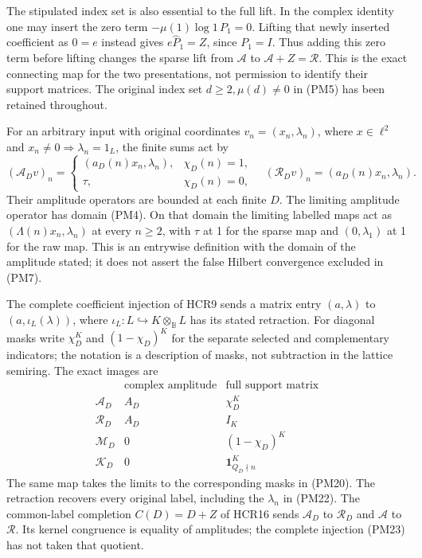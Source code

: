 \documentclass[
  10pt,
  a4paper,
]{article}
\begin{document}
The stipulated index set is also essential to the full lift. In the
complex identity one may insert the zero term \(-\mu(1)\log1\,P_1=0\).
Lifting that newly inserted coefficient as \(\widehat0=e\) instead gives
\(e\widehat P_1=Z\), since \(P_1=I\). Thus adding this zero term before
lifting changes the sparse lift from \(\mathcal A\) to
\(\mathcal A+Z=\mathcal R\). This is the exact connecting map for the
two presentations, not permission to identify their support matrices.
The original index set \(d\ge2,\mu(d)\ne0\) in (PM5) has been retained
throughout.

For an arbitrary input with original coordinates
\(v_n=(x_n,\lambda_n)\), where \(x\in\ell^2\) and
\(x_n\ne0\Rightarrow\lambda_n=1_L\), the finite sums act by \[
(\mathcal A_Dv)_n=
\begin{cases}(a_D(n)x_n,\lambda_n),&\chi_D(n)=1,\\\tau,&\chi_D(n)=0,\end{cases}
\quad
(\mathcal R_Dv)_n=(a_D(n)x_n,\lambda_n).
\tag{PM22}
\] Their amplitude operators are bounded at each finite \(D\). The
limiting amplitude operator has domain (PM4). On that domain the
limiting labelled maps act as \((\Lambda(n)x_n,\lambda_n)\) at every
\(n\ge2\), with \(\tau\) at 1 for the sparse map and \((0,\lambda_1)\)
at 1 for the raw map. This is an entrywise definition with the domain of
the amplitude stated; it does not assert the false Hilbert convergence
excluded in (PM7).

The complete coefficient injection of HCR9 sends a matrix entry
\((a,\lambda)\) to \((a,\iota_L(\lambda))\), where
\(\iota_L:L\hookrightarrow K\otimes_{\mathbb B}L\) has its stated
retraction. For diagonal masks write \(\chi_D^K\) and \((1-\chi_D)^K\)
for the separate selected and complementary indicators; the notation is
a description of masks, not subtraction in the lattice semiring. The
exact images are \[
\begin{array}{c|cc}
&\text{complex amplitude}&\text{full support matrix}\\\hline
\mathcal A_D&A_D&\chi_D^K\\
\mathcal R_D&A_D&I_K\\
\mathcal M_D&0&(1-\chi_D)^K\\
\mathcal K_D&0&\mathbf1_{Q_D\nmid n}^{K}
\end{array}
\tag{PM23}
\] The same map takes the limits to the corresponding masks in (PM20).
The retraction recovers every original label, including the
\(\lambda_n\) in (PM22). The common-label completion \(C(D)=D+Z\) of
HCR16 sends \(\mathcal A_D\) to \(\mathcal R_D\) and \(\mathcal A\) to
\(\mathcal R\). Its kernel congruence is equality of amplitudes; the
complete injection (PM23) has not taken that quotient.
\end{document}
